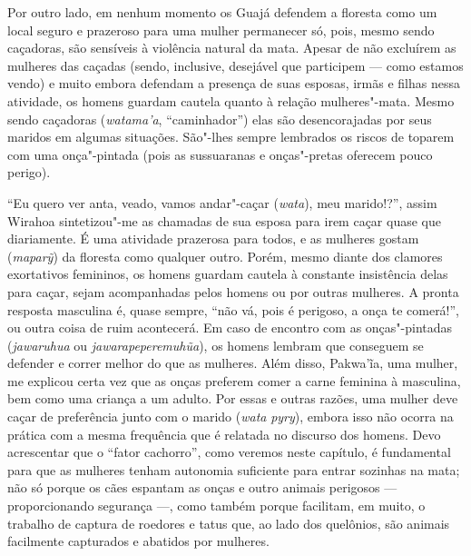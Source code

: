 
Por outro lado, em nenhum momento os Guajá defendem a floresta como um
local seguro e prazeroso para uma mulher permanecer só, pois, mesmo
sendo caçadoras, são sensíveis à violência natural da mata. Apesar de
não excluírem as mulheres das caçadas (sendo, inclusive, desejável que
participem --- como estamos vendo) e muito embora defendam a presença de
suas esposas, irmãs e filhas nessa atividade, os homens guardam cautela
quanto à relação mulheres"-mata. Mesmo sendo caçadoras (\emph{watama'a},
``caminhador'') elas são desencorajadas por seus maridos em algumas
situações. São"-lhes sempre lembrados os riscos de toparem com uma
onça"-pintada (pois as sussuaranas e onças"-pretas oferecem pouco perigo).

``Eu quero ver anta, veado, vamos andar"-caçar (\emph{wata}), meu
marido!?'', assim Wirahoa sintetizou"-me as chamadas de sua esposa para
irem caçar quase que diariamente. É uma atividade prazerosa para todos,
e as mulheres gostam (\emph{maparỹ}) da floresta como qualquer outro.
Porém, mesmo diante dos clamores exortativos femininos, os homens
guardam cautela à constante insistência delas para caçar, sejam
acompanhadas pelos homens ou por outras mulheres. A pronta resposta
masculina é, quase sempre, ``não vá, pois é perigoso, a onça te comerá!'',
ou outra coisa de ruim acontecerá. Em caso de encontro com as
onças"-pintadas (\emph{jawaruhua} ou \emph{jawarapeperemuhũa}), os homens
lembram que conseguem se defender e correr melhor do que as mulheres.
Além disso, Pakwa'ĩa, uma mulher, me explicou certa vez que as onças
preferem comer a carne feminina à masculina, bem como uma criança a um
adulto. Por essas e outras razões, uma mulher deve caçar de preferência
junto com o marido (\emph{wata} \emph{pyry}), embora isso não ocorra na
prática com a mesma frequência que é relatada no discurso dos homens.
Devo acrescentar que o ``fator cachorro'', como veremos neste capítulo, é
fundamental para que as mulheres tenham autonomia suficiente para entrar
sozinhas na mata; não só porque os cães espantam as onças e outro
animais perigosos --- proporcionando segurança ---, como também porque
facilitam, em muito, o trabalho de captura de roedores e tatus que, ao
lado dos quelônios, são animais facilmente capturados e abatidos por
mulheres.

